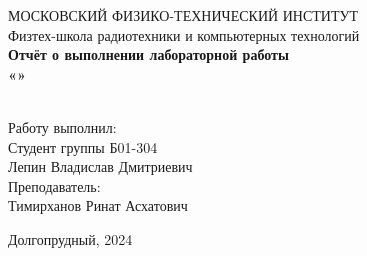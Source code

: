 \begin{center}
МОСКОВСКИЙ ФИЗИКО-ТЕХНИЧЕСКИЙ ИНСТИТУТ \\

\hfill \break
Физтех-школа радиотехники и компьютерных технологий\\
\vspace{5cm}
\large{\textbf{Отчёт о выполнении лабораторной работы  \\ «»}}\\
\hfill \break
\\
\end{center}

\vspace{5cm}
 
\begin{flushright}
Работу выполнил:\\
Студент группы Б01-304\\
Лепин Владислав Дмитриевич\\
Преподаватель:\\
Тимирханов Ринат Асхатович\\
\end{flushright}
 
\vfill


\begin{center} Долгопрудный, 2024 \end{center}

\thispagestyle{empty}
\newpage